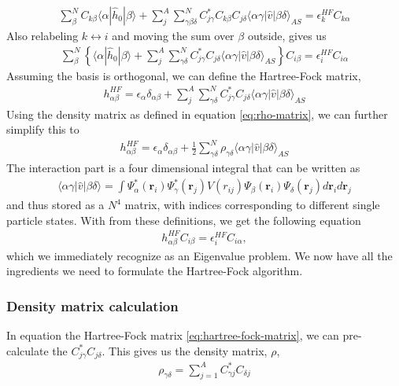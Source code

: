\documentclass[11pt]{article}
\begin{document}
\begin{align*}
	\sum^N_{\beta} C_{k\beta} \langle\alpha|\hat{h}_0|\beta\rangle + \sum^A_{j}\sum^N_{\gamma\beta\delta} C^*_{j\gamma}C_{k\beta}C_{j\delta} \langle \alpha\gamma|\hat{v}|\beta\delta\rangle_{AS} = \epsilon_k^{HF} C_{k\alpha}
\end{align*}
Also relabeling $k \leftrightarrow i$ and moving the sum over $\beta$ outside, gives us
\begin{align*}
	\sum^N_{\beta} \left\{ \langle\alpha|\hat{h}_0|\beta\rangle + \sum^A_{j}\sum^N_{\gamma\delta} C^*_{j\gamma}C_{j\delta} \langle \alpha\gamma|\hat{v}|\beta\delta\rangle_{AS} \right\} C_{i\beta} = \epsilon_i^{HF} C_{i\alpha}
\end{align*}
Assuming the basis is orthogonal, we can define the Hartree-Fock matrix,
\begin{align}
	h^{HF}_{\alpha\beta} = \epsilon_\alpha\delta_{\alpha\beta} + \sum^A_{j}\sum^N_{\gamma\delta} C^*_{j\gamma}C_{j\delta} \langle \alpha\gamma|\hat{v}|\beta\delta\rangle_{AS}
	\label{eq:hartree-fock-matrix}
\end{align}
Using the density matrix as defined in equation \eqref{eq:rho-matrix}, we can further simplify this to
\begin{align}
	h^{HF}_{\alpha\beta} = \epsilon_\alpha\delta_{\alpha\beta} + \frac{1}{2}\sum^N_{\gamma\delta} \rho_{\gamma\delta} \langle \alpha\gamma|\hat{v}|\beta\delta\rangle_{AS}
	\label{eq:hartree-fock-matrix-rho}
\end{align}
The interaction part is a four dimensional integral that can be written as
\begin{align}
	\langle \alpha\gamma|\hat{v}|\beta\delta\rangle = \int \Psi_\alpha^*(\mathbf{r}_i) \Psi_\gamma^*(\mathbf{r}_j) V(r_{ij}) \Psi_\beta(\mathbf{r}_i) \Psi_\delta(\mathbf{r}_j) d\mathbf{r}_i d\mathbf{r}_j 
	\label{eq:interaction-matrix}
\end{align}
and thus stored as a $N^4$ matrix, with indices corresponding to different single particle states. With from these definitions, we get the following equation
\begin{align}
	h^{HF}_{\alpha\beta} C_{i\beta} = \epsilon_i^{HF} C_{i\alpha},
	\label{eq:eigen-value-problem}
\end{align}
which we immediately recognize as an Eigenvalue problem. We now have all the ingredients we need to formulate the Hartree-Fock algorithm.

\subsubsection{Density matrix calculation}
In equation the Hartree-Fock matrix \eqref{eq:hartree-fock-matrix}, we can pre-calculate the $C_{j\gamma}^* C_{j\delta}$. This gives us the density matrix, $\rho$,
\begin{align}
	\rho_{\gamma\delta} = \sum_{j=1}^A C_{\gamma j}^* C_{\delta j}
	\label{eq:rho-matrix}
\end{align}
\end{document}
